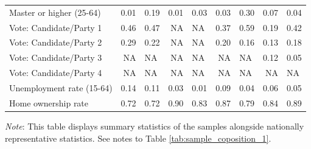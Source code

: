 \begin{table}[h!]
{{\begin{tabular}[t]{lrlrlrlrl}
    \addlinespace
    Master or higher (25-64) & 0.01 & 0.19 & 0.01 & 0.03 & 0.03 & 0.30 & 0.07 & 0.04\\
    \addlinespace
    Vote: Candidate/Party 1 & 0.46 & 0.47 & NA & NA & 0.37 & 0.59 & 0.19 & 0.42\\
    Vote: Candidate/Party 2 & 0.29 & 0.22 & NA & NA & 0.20 & 0.16 & 0.13 & 0.18\\
    Vote: Candidate/Party 3 & NA & NA & NA & NA & NA & NA & 0.12 & 0.05\\
    Vote: Candidate/Party 4 & NA & NA & NA & NA & NA & NA & NA & NA\\
    \addlinespace
    Unemployment rate (15-64) & 0.14 & 0.11 & 0.03 & 0.01 & 0.09 & 0.04 & 0.06 & 0.05\\
    \addlinespace
    Home ownership rate & 0.72 & 0.72 & 0.90 & 0.83 & 0.87 & 0.79 & 0.84 & 0.89\\
    \bottomrule
    \end{tabular}
            }
        } \label{tab:sample_composition_4}
        {\footnotesize \textit{Note}: This table displays summary statistics of the samples alongside nationally representative statistics. See notes to Table \ref{tab:sample_coposition_1}. }
    \end{table}
    
